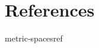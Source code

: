 \documentclass[preview]{standalone}
\begin{document}
\genpage

\nocite{*} %

\section{References}

\begin{snippet}{metric-spacesref}
    \printbibliography[heading=none]
\end{snippet}
\end{document}
